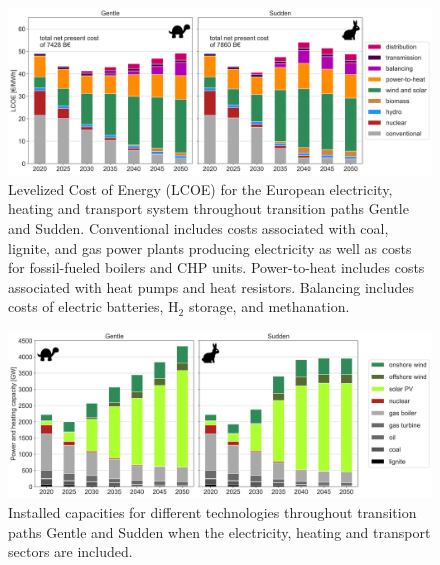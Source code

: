 \documentclass[3p]{elsarticle} %
\begin{document}
\begin{figure}[!h]
	\centering
	\includegraphics[width=\columnwidth]{../figures/LCOE_w_EV_exp.png}
	\caption{Levelized Cost of Energy (LCOE) for the European electricity, heating and transport system throughout transition paths Gentle and Sudden. Conventional includes costs associated with coal, lignite, and gas power plants producing electricity as well as costs for fossil-fueled boilers and CHP units. Power-to-heat includes costs associated with heat pumps and heat resistors. Balancing includes costs of electric batteries, H$_2$ storage, and methanation.} 
\end{figure}

\begin{figure}[!h]
	\centering
	\includegraphics[width=\columnwidth]{../figures/installed_capacity_w_EV_exp.png}
	\caption{Installed capacities for different technologies throughout transition paths Gentle and Sudden when the electricity, heating and transport sectors are included. } 
\end{figure}

\FloatBarrier


\end{document}
